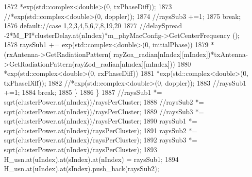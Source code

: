 \begin{DoxyCode}
1872                                                                 *exp(std::complex<double>(0, txPhaseDiff));
1873                                                                 \textcolor{comment}{//*exp(std::complex<double>(0, doppler));}
1874                                                         \textcolor{comment}{//raysSub3 +=1;}
1875                                                         \textcolor{keywordflow}{break};
1876                                                 \textcolor{keywordflow}{default}:\textcolor{comment}{//case 1,2,3,4,5,6,7,8,19,20}
1877                                                         \textcolor{comment}{//delaySpread =
       -2*M\_PI*clusterDelay.at(nIndex)*m\_phyMacConfig->GetCenterFrequency ();}
1878                                                         raysSub1 += exp(std::complex<double>(0, 
      initialPhase))
1879                                                                 *(rxAntenna->GetRadiationPattern(
      rayZoa\_radian[nIndex][mIndex])*txAntenna->GetRadiationPattern(rayZod\_radian[nIndex][mIndex]))
1880                                                                 *exp(std::complex<double>(0, rxPhaseDiff))
1881                                                                 *exp(std::complex<double>(0, txPhaseDiff));
1882                                                                 \textcolor{comment}{//*exp(std::complex<double>(0, doppler));}
1883                                                         \textcolor{comment}{//raysSub1 +=1;}
1884                                                         \textcolor{keywordflow}{break};
1885                                                 \}
1886                                         \}
1887                                         \textcolor{comment}{//raysSub1 *= sqrt(clusterPower.at(nIndex))/raysPerCluster;}
1888                                         \textcolor{comment}{//raysSub2 *= sqrt(clusterPower.at(nIndex))/raysPerCluster;}
1889                                         \textcolor{comment}{//raysSub3 *= sqrt(clusterPower.at(nIndex))/raysPerCluster;}
1890                                         raysSub1 *= sqrt(clusterPower.at(nIndex)/raysPerCluster);
1891                                         raysSub2 *= sqrt(clusterPower.at(nIndex)/raysPerCluster);
1892                                         raysSub3 *= sqrt(clusterPower.at(nIndex)/raysPerCluster);
1893                                         H\_usn.at(uIndex).at(sIndex).at(nIndex) = raysSub1;
1894                                         H\_usn.at(uIndex).at(sIndex).push\_back(raysSub2);

\end{DoxyCode}
